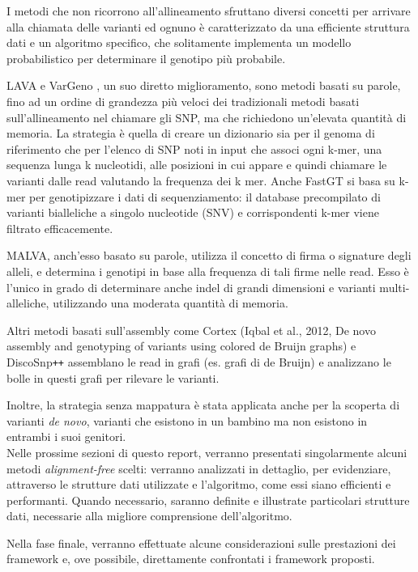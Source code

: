 \documentclass[../main.tex]{subfiles}
\begin{document}
I metodi che non ricorrono all'allineamento sfruttano diversi concetti per arrivare alla chiamata delle varianti ed ognuno è caratterizzato da una efficiente struttura dati e un algoritmo specifico, che solitamente implementa un modello probabilistico per determinare il genotipo più probabile. 

LAVA \cite{shajii2016lava} e VarGeno \cite{sun-medvedev2018vargeno}, un suo diretto miglioramento, sono metodi basati su parole, fino ad un ordine di grandezza più veloci dei tradizionali metodi basati sull'allineamento nel chiamare gli SNP, ma che richiedono un'elevata quantità di memoria. La strategia è quella di creare un dizionario sia per il genoma di riferimento che per l'elenco di SNP noti in input che associ ogni k-mer, una sequenza lunga k nucleotidi, alle posizioni in cui appare e quindi chiamare le varianti dalle read valutando la frequenza dei k mer. Anche FastGT \cite{pajuste2017fastgt} si basa su k-mer per genotipizzare i dati di sequenziamento: il database precompilato di varianti bialleliche a singolo nucleotide (SNV) e corrispondenti k-mer viene filtrato efficacemente.

MALVA, anch'esso basato su parole, utilizza il concetto di firma o signature degli alleli, e determina i genotipi in base alla frequenza di tali firme nelle read. Esso è l'unico in grado di determinare anche indel di grandi dimensioni e varianti multi-alleliche, utilizzando una moderata quantità di memoria.

Altri metodi basati sull'assembly come Cortex (Iqbal et al., 2012, De novo assembly and genotyping of variants using colored de Bruijn graphs) e DiscoSnp\texttt{++} \cite{peterlongo2017discosnp++} assemblano le read in grafi (es. grafi di de Bruijn) e analizzano le bolle in questi grafi per rilevare le varianti. 

Inoltre, la strategia senza mappatura è stata applicata anche per la scoperta di varianti \textit{de novo}, varianti che esistono in un bambino ma non esistono in entrambi i suoi genitori.\\


Nelle prossime sezioni di questo report, verranno presentati singolarmente alcuni metodi \textit{alignment-free} scelti: verranno analizzati in dettaglio, per evidenziare, attraverso le strutture dati utilizzate e l'algoritmo, come essi siano efficienti e performanti. Quando necessario, saranno definite e illustrate particolari strutture dati, necessarie alla migliore comprensione dell'algoritmo.

Nella fase finale, verranno effettuate alcune considerazioni sulle prestazioni dei framework e, ove possibile, direttamente confrontati i framework proposti.
\end{document}
